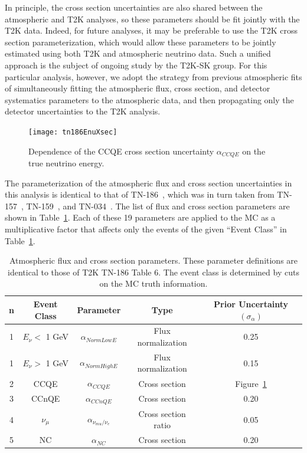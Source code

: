 {In principle, the cross section uncertainties are also shared between the
atmospheric and T2K analyses, so these parameters should be fit jointly with
the T2K data. Indeed, for future analyses, it may be preferable to use the T2K
cross section parameterization, which would allow these parameters to be
jointly estimated using both T2K and atmospheric neutrino data. Such a unified
approach is the subject of ongoing study by the T2K-SK group. For this
particular analysis, however, we adopt the strategy from previous atmospheric fits of
simultaneously fitting the atmospheric flux, cross section, and detector
systematics parameters to the atmospheric data, and then propagating only the
detector uncertainties to the T2K analysis. 

\begin{figure}[h]
  \begin{center}
    \texttt{[image: tn186EnuXsec]}
  \end{center}
  \caption{Dependence of the CCQE cross section uncertainty $\alpha_{CCQE}$ on
  the true neutrino energy.}
  \label{fig:alphaccqe}
\end{figure}

The parameterization of the atmospheric flux and cross section uncertainties in
this analysis is identical to that of TN-186~\cite{tn186}, which was in turn taken from
TN-157~\cite{tn157}, TN-159~\cite{tn159}, and TN-034~\cite{tn034}. The list of
flux and cross section parameters are shown in Table~\ref{tab:alpha}.  Each of
these 19 parameters are applied to the MC as a multiplicative factor that
affects only the events of the given ``Event Class'' in Table~\ref{tab:alpha}.

\begin{table}
  \centering
  \begin{tabular}{c c | c | c | c }
    \hline\hline
    n & Event Class & Parameter & Type & Prior Uncertainty $(\sigma_{\alpha})$ \\
    \hline 
    1 & $E_{\nu} <$ 1 GeV & $\alpha_{NormLowE}$ & Flux normalization & 0.25 \\
    1 & $E_{\nu} >$ 1 GeV & $\alpha_{NormHighE}$ & Flux normalization & 0.15 \\
    2 & CCQE & $\alpha_{CCQE}$ & Cross section & Figure~\ref{fig:alphaccqe} \\
    3 & CCnQE & $\alpha_{CCnQE}$ & Cross section & 0.20 \\
    4 & $\nu_{\mu}$ & $\alpha_{\nu_{mu}/\nu_{e}}$ & Cross section ratio & 0.05 \\
    5 & NC & $\alpha_{NC}$ & Cross section & 0.20 \\
    \hline\hline
  \end{tabular}
  \caption{Atmospheric flux and cross section parameters.  These parameter
  definitions are identical to those of T2K TN-186 Table 6. The event class is
  determined by cuts on the MC truth information.}
  \label{tab:alpha}
\end{table}




}

